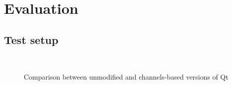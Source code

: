 \documentclass[letterpaper,twocolumn,11pt]{article}
\begin{document}
\section{Evaluation}

\subsection{Test setup}

\begin{figure}[t]
  \begin{center}
     \\
  \end{center}
  \caption{Comparison between unmodified and channels-based versions of Qt}
  \label{fig:benchmarks}
\end{figure}
\end{document}
